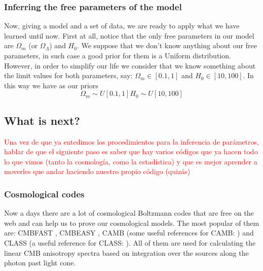 \documentclass[onecolumn,           %
               showpacs,            %
               preprintnumbers,     %
               aps,                 %
               prl,          	    %
               letterpaper,             %
               superscriptaddress,      %
               nofootinbib,         %
               tightenlines,        %
               floats,floatfix      %
               ,usenatbib,
               ]{revtex4-1}
\begin{document}
\subsubsection{Inferring the free parameters of the model}

Now, giving a model and a set of data, we are ready to apply what we have learned until now. First at all, notice that the only free parameters in our model are $\Omega_m$ (or $\Omega_\Lambda$) and $H_0$. We suppose that we don't know anything about our free parameters, in such case a good prior for them is a Uniform distribution. However, in order to simplify our life we consider that we know something about the limit values for both parameters,  say: $\Omega_m\in [0.1,1]$ and $H_0\in [10,100]$. In this way we have as our priors
\begin{subequations}
\begin{equation}
\Omega_m\sim U[0.1,1]
\end{equation}
\begin{equation}
H_0\sim U[10,100]
\end{equation}
\end{subequations} 
\subsection{What is next?}

\textcolor{red}{Una vez de que ya entedimos los procedimientos para la inferencia de par\'ametros, hablar de que el siguiente paso es saber que hay varios c\'odigos que ya hacen todo lo que vimos (tanto la cosmolog\'ia, como la estad\'istica) y que es mejor aprender a moverles que andar haciendo nuestro propio código (quiz\'as)}
\subsubsection{Cosmological codes}

Now a days there are a lot of cosmological Boltzmann codes that are free on the web and can help us to prove our cosmological models. The most popular of them are: CMBFAST \cite{cmbfast1}, CMBEASY \cite{cmbeasy}, CAMB \cite{camb1} (some useful references for CAMB: \cite{camb2,camb3,camb4}) and CLASS \cite{class1} (a useful reference for CLASS: \cite{mont1}). All of them are used for calculating the linear CMB anisotropy spectra based on integration over the sources along the photon past light cone.

\end{document}
